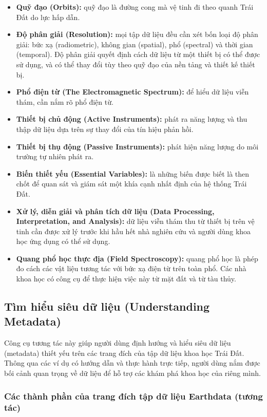 \begin{itemize}
\item
  \textbf{Quỹ đạo (Orbits):} quỹ đạo là đường cong mà vệ tinh đi theo quanh Trái Đất do lực hấp dẫn.
\item
  \textbf{Độ phân giải (Resolution):} mọi tập dữ liệu đều cần xét bốn loại độ phân giải: bức xạ (radiometric), không gian (spatial), phổ (spectral) và thời gian (temporal). Độ phân giải quyết định cách dữ liệu từ một thiết bị có thể được sử dụng, và có thể thay đổi tùy theo quỹ đạo của nền tảng và thiết kế thiết bị.
\item
  \textbf{Phổ điện từ (The Electromagnetic Spectrum):} để hiểu dữ liệu viễn thám, cần nắm rõ phổ điện từ.
\item
  \textbf{Thiết bị chủ động (Active Instruments):} phát ra năng lượng và thu thập dữ liệu dựa trên sự thay đổi của tín hiệu phản hồi.
\item
  \textbf{Thiết bị thụ động (Passive Instruments):} phát hiện năng lượng do môi trường tự nhiên phát ra.
\item
  \textbf{Biến thiết yếu (Essential Variables):} là những biến được biết là then chốt để quan sát và giám sát một khía cạnh nhất định của hệ thống Trái Đất.
\item
  \textbf{Xử lý, diễn giải và phân tích dữ liệu (Data Processing, Interpretation, and Analysis):} dữ liệu viễn thám thu từ thiết bị trên vệ tinh cần được xử lý trước khi hầu hết nhà nghiên cứu và người dùng khoa học ứng dụng có thể sử dụng.
\item
  \textbf{Quang phổ học thực địa (Field Spectroscopy):} quang phổ học là phép đo cách các vật liệu tương tác với bức xạ điện từ trên toàn phổ. Các nhà khoa học có công cụ để thực hiện việc này từ mặt đất và từ tàu thủy.
\end{itemize}

\subsection{Tìm hiểu siêu dữ liệu (Understanding Metadata)}

Công cụ tương tác này giúp người dùng định hướng và hiểu siêu dữ liệu (metadata) thiết yếu trên các trang đích của tập dữ liệu khoa học Trái Đất. Thông qua các ví dụ có hướng dẫn và thực hành trực tiếp, người dùng nắm được bối cảnh quan trọng về dữ liệu để hỗ trợ các khám phá khoa học của riêng mình.

\subsubsection{Các thành phần của trang đích tập dữ liệu Earthdata (tương tác)}

